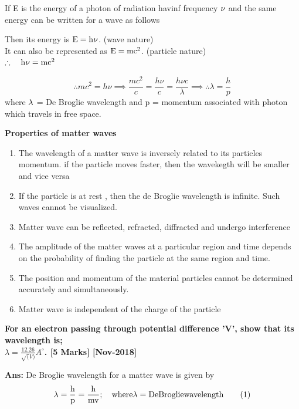 \documentclass{exam}
\begin{document}
\begin{questions}
If  E is the energy of a photon of radiation havinf frequency $\rm \nu$ and the same energy can be written for a wave as follows
\begin{center}
Then its energy is $\rm E = h \nu $.  (wave nature)\\
It can also be represented as $\rm E = mc^2 $.  (particle nature)\\
$\rm \therefore \quad h \nu = mc^2$ \\
\end{center}
\begin{equation*}
\therefore mc^2 = h \nu \implies \frac{mc^2}{c} = \frac{h \nu}{c} = \frac{h \nu c} {\lambda} \implies \therefore \lambda = \frac{h}{p}
\end{equation*}
where $\rm \lambda$ = De Broglie wavelength and p = momentum associated with photon which travels in free space.

\newpage

\textbf{Properties of matter waves}
\begin{enumerate}
\item The wavelength of a matter wave is inversely related to its particles momentum. if the particle moves faster, then the wavekegth will be smaller and vice versa
\item If the particle is at rest , then the de Broglie wavelength is infinite. Such waves cannot be visualized.
\item Matter wave can be reflected, refracted, diffracted and undergo interference
\item The amplitude of the matter waves at a particular region and time depends on the probability of finding the particle at the same region and time.
\item The position and momentum of the material particles cannot be determined accurately
and simultaneously.
\item  Matter wave is independent of the charge of the particle
\end{enumerate}

\question \textbf{ For an electron passing through potential difference 'V', show that its wavelength is;  \\ $\lambda = \frac{12.26}{\sqrt(V)}  A^{\circ}$. \hfil [5 Marks] [Nov-2018]  
}

\textbf{Ans:} De Broglie wavelength for a matter wave is given by 
\begin{equation*}
\rm \lambda = \frac{h}{p} = \frac{h}{mv}; \quad where \lambda = De Broglie wavelength \qquad (1)
\end{equation*}


\end{questions}
\end{document}
